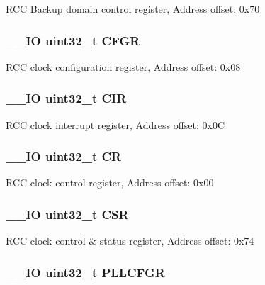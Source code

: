 R\-C\-C Backup domain control register, Address offset\-: 0x70 \hypertarget{struct_r_c_c___type_def_a26f1e746ccbf9c9f67e7c60e61085ec1}{
\subsubsection[{C\-F\-G\-R}]{\setlength{\rightskip}{0pt plus 5cm}\-\_\-\-\_\-\-I\-O uint32\-\_\-t C\-F\-G\-R}}\label{struct_r_c_c___type_def_a26f1e746ccbf9c9f67e7c60e61085ec1}
R\-C\-C clock configuration register, Address offset\-: 0x08 \hypertarget{struct_r_c_c___type_def_a907d8154c80b7e385478943f90b17a3b}{
\subsubsection[{C\-I\-R}]{\setlength{\rightskip}{0pt plus 5cm}\-\_\-\-\_\-\-I\-O uint32\-\_\-t C\-I\-R}}\label{struct_r_c_c___type_def_a907d8154c80b7e385478943f90b17a3b}
R\-C\-C clock interrupt register, Address offset\-: 0x0\-C \hypertarget{struct_r_c_c___type_def_ab40c89c59391aaa9d9a8ec011dd0907a}{
\subsubsection[{C\-R}]{\setlength{\rightskip}{0pt plus 5cm}\-\_\-\-\_\-\-I\-O uint32\-\_\-t C\-R}}\label{struct_r_c_c___type_def_ab40c89c59391aaa9d9a8ec011dd0907a}
R\-C\-C clock control register, Address offset\-: 0x00 \hypertarget{struct_r_c_c___type_def_a876dd0a8546697065f406b7543e27af2}{
\subsubsection[{C\-S\-R}]{\setlength{\rightskip}{0pt plus 5cm}\-\_\-\-\_\-\-I\-O uint32\-\_\-t C\-S\-R}}\label{struct_r_c_c___type_def_a876dd0a8546697065f406b7543e27af2}
R\-C\-C clock control \& status register, Address offset\-: 0x74 \hypertarget{struct_r_c_c___type_def_ae6ff257862eba6b4b367feea786bf1fd}{
\subsubsection[{P\-L\-L\-C\-F\-G\-R}]{\setlength{\rightskip}{0pt plus 5cm}\-\_\-\-\_\-\-I\-O uint32\-\_\-t P\-L\-L\-C\-F\-G\-R}}\label{struct_r_c_c___type_def_ae6ff257862eba6b4b367feea786bf1fd}
